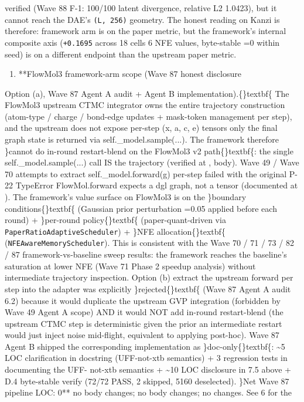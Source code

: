 \documentclass{article}
\begin{document}
verified (Wave 88 F-1: 100/100 latent divergence, relative L2 1.0423), but it cannot reach the DAE's \texttt{(L, 256)} geometry. The honest reading on Kanzi is therefore: framework arm is  on the paper metric, but the framework's internal composite axis (\texttt{+0.1695} across 18 cells  6 NFE values, byte-stable =0 within seed) is  on a different endpoint than the upstream paper metric.

\begin{enumerate}
\item **FlowMol3 framework-arm scope (Wave 87 honest disclosure 
\end{enumerate}
Option (a), Wave 87 Agent A audit + Agent B implementation).\{\}textbf\{ The FlowMol3 upstream CTMC integrator owns the entire trajectory construction (atom-type / charge / bond-edge updates + mask-token management per step), and the upstream does not expose per-step \texttt{}(x, a, c, e)\texttt{} tensors  only the final graph state is returned via \texttt{}self.\_model.sample(...)\texttt{}. The framework therefore \}cannot do in-round restart-blend on the FlowMol3 v2 path\{\}textbf\{: the single \texttt{}self.\_model.sample(...)\texttt{} call IS the trajectory (verified at ,  body). Wave 49 / Wave 70 attempts to extract \texttt{}self.\_model.forward(g)\texttt{} per-step failed with the original P-22 TypeError  \texttt{}FlowMol.forward\texttt{} expects a dgl graph, not a tensor (documented at ). The framework's value surface on FlowMol3 is on the \}boundary conditions\{\}textbf\{ (Gaussian prior perturbation =0.05 applied before each round) + \}per-round policy\{\}textbf\{ (paper-quant-driven  via \texttt{PaperRatioAdaptiveScheduler}) + \}NFE allocation\{\}textbf\{ (\texttt{NFEAwareMemoryScheduler}). This is consistent with the Wave 70 / 71 / 73 / 82 / 87 framework-vs-baseline sweep results: the framework reaches the baseline's saturation at lower NFE (Wave 71 Phase 2 speedup analysis) without intermediate trajectory inspection. Option (b)  extract the upstream forward per step into the adapter  was explicitly \}rejected\{\}textbf\{ (Wave 87 Agent A audit 6.2) because it would duplicate the upstream GVP integration (forbidden by Wave 49 Agent A scope) AND it would NOT add in-round restart-blend (the upstream CTMC step is deterministic given the prior  an intermediate restart would just inject noise mid-flight, equivalent to applying  post-hoc). Wave 87 Agent B shipped the corresponding implementation as \}doc-only\{\}textbf\{: \textasciitilde{}5 LOC clarification in  docstring (UFF-not-xtb semantics) + 3 regression tests in  documenting the UFF- not-xtb semantics + \textasciitilde{}10 LOC disclosure in 7.5 above + D.4 byte-stable verify (72/72 PASS, 2 skipped, 5160 deselected). \}Net Wave 87 pipeline LOC: 0**  no  body changes; no  body changes; no  changes. See  6 for the 
\end{document}
